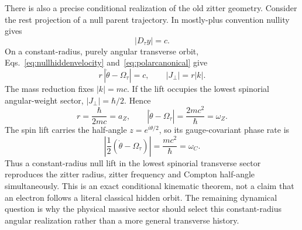 \documentclass[11pt]{article}
\theoremstyle{definition}\newtheorem{definition}[theorem]{Definition}
\theoremstyle{remark}\newtheorem{remark}[theorem]{Remark}\newtheorem{conjecture}[theorem]{Conjecture}
\begin{document}
There is also a precise conditional realization of the old zitter geometry. Consider the rest projection of a null parent trajectory. In mostly-plus convention nullity gives
\begin{equation}\label{eq:nullhiddenvelocity}
 |D_\tau y|=c.
\end{equation}
On a constant-radius, purely angular transverse orbit, Eqs.~\eqref{eq:nullhiddenvelocity} and~\eqref{eq:polarcanonical} give
\begin{equation}
 r\,|\dot\theta-\Omega_\tau|=c,
 \qquad
 |J_\perp|=r|k|.
\end{equation}
The mass reduction fixes $|k|=mc$. If the lift occupies the lowest spinorial angular-weight sector, $|J_\perp|=\hbar/2$. Hence
\begin{equation}\label{eq:zitterfromparent}
 \boxed{
 r=\frac{\hbar}{2mc}=a_Z,
 \qquad
 |\dot\theta-\Omega_\tau|
 =\frac{2mc^2}{\hbar}=\omega_Z.}
\end{equation}
The spin lift carries the half-angle $z=e^{i\theta/2}$, so its gauge-covariant phase rate is
\begin{equation}\label{eq:comptonfromparentcircle}
 \boxed{
 \left|\frac12(\dot\theta-\Omega_\tau)\right|
 =\frac{mc^2}{\hbar}=\omega_C.}
\end{equation}
Thus a constant-radius null lift in the lowest spinorial transverse sector reproduces the zitter radius, zitter frequency and Compton half-angle simultaneously. This is an exact conditional kinematic theorem, not a claim that an electron follows a literal classical hidden orbit. The remaining dynamical question is why the physical massive sector should select this constant-radius angular realization rather than a more general transverse history.
\end{document}
